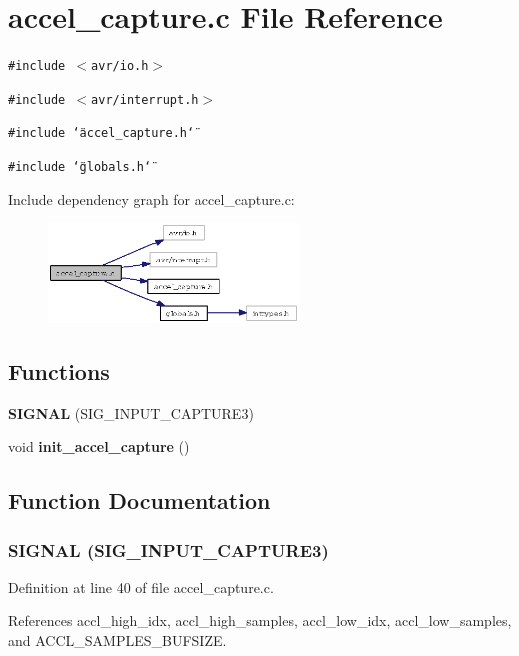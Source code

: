 \section{accel\_\-capture.c File Reference}
\label{accel__capture_8c}
{\tt \#include $<$avr/io.h$>$}\par
{\tt \#include $<$avr/interrupt.h$>$}\par
{\tt \#include \char`\"{}accel\_\-capture.h\char`\"{}}\par
{\tt \#include \char`\"{}globals.h\char`\"{}}\par


Include dependency graph for accel\_\-capture.c:\begin{figure}[H]
\begin{center}
\leavevmode
\includegraphics[width=188pt]{accel__capture_8c__incl}
\end{center}
\end{figure}
\subsection*{Functions}
\begin{CompactItemize}
\item 
{\bf SIGNAL} (SIG\_\-INPUT\_\-CAPTURE3)
\item 
void {\bf init\_\-accel\_\-capture} ()
\end{CompactItemize}


\subsection{Function Documentation}
\subsubsection{\setlength{\rightskip}{0pt plus 5cm}SIGNAL (SIG\_\-INPUT\_\-CAPTURE3)}\label{accel__capture_8c_3796dad092b974fdc241edd6f0849b83}




Definition at line 40 of file accel\_\-capture.c.

References accl\_\-high\_\-idx, accl\_\-high\_\-samples, accl\_\-low\_\-idx, accl\_\-low\_\-samples, and ACCL\_\-SAMPLES\_\-BUFSIZE.
